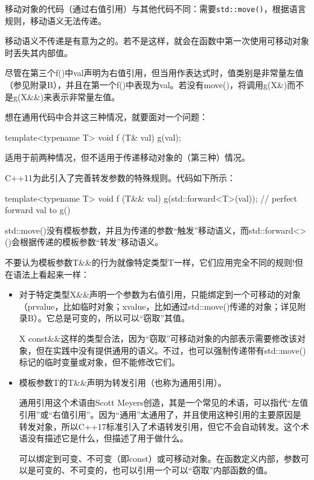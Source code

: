 移动对象的代码（通过右值引用）与其他代码不同：需要\texttt{std::move()}，根据语言规则，移动语义无法传递。

\begin{notice}
移动语义不传递是有意为之的。若不是这样，就会在函数中第一次使用可移动对象时丢失其内部值。
\end{notice}

尽管在第三个f()中val声明为右值引用，但当用作表达式时，值类别是非常量左值（参见附录B），并且在第一个f()中表现为val。若没有move()，将调用g(X\&)而不是g(X\&\&)来表示非常量左值。

想在通用代码中合并这三种情况，就要面对一个问题：

\begin{cpp}
template<typename T>
void f (T& val) {
	g(val);
}
\end{cpp}

适用于前两种情况，但不适用于传递移动对象的（第三种）情况。

C++11为此引入了完善转发参数的特殊规则。代码如下所示：

\begin{cpp}
template<typename T>
void f (T&& val) {
	g(std::forward<T>(val)); // perfect forward val to g()
}
\end{cpp}

std::move()没有模板参数，并且为传递的参数“触发”移动语义，而std::forward<>()会根据传递的模板参数“转发”移动语义。

不要认为模板参数T\&\&的行为就像特定类型T一样，它们应用完全不同的规则!但在语法上看起来一样：

\begin{itemize}
\item 
对于特定类型X\&\&声明一个参数为右值引用，只能绑定到一个可移动的对象（prvalue，比如临时对象；xvalue，比如通过std::move()传递的对象；详见附录B）。它总是可变的，所以可以“窃取”其值。

\begin{notice}
X const\&\&这样的类型合法，因为“窃取”可移动对象的内部表示需要修改该对象，但在实践中没有提供通用的语义。不过，也可以强制传递带有std::move()标记的临时变量或对象，但不能修改它们。
\end{notice}

\item 
模板参数T的T\&\&声明为转发引用（也称为通用引用）。

\begin{notice}
通用引用这个术语由Scott Meyers创造，其是一个常见的术语，可以指代“左值引用”或“右值引用”。因为“通用”太通用了，并且使用这种引用的主要原因是转发对象，所以C++17标准引入了术语转发引用，但它不会自动转发。这个术语没有描述它是什么，但描述了用于做什么。
\end{notice}

可以绑定到可变、不可变（即const）或可移动对象。在函数定义内部，参数可以是可变的、不可变的，也可以引用一个可以“窃取”内部函数的值。
\end{itemize}

